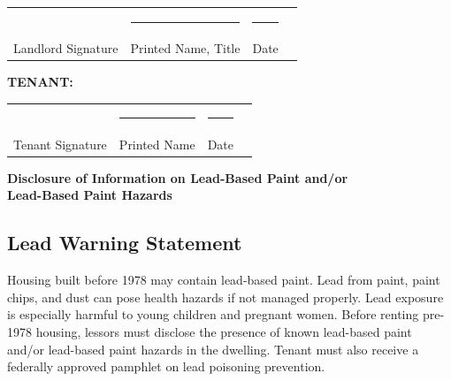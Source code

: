 \documentclass[12pt]{article}
\begin{document}
{\begin{minipage}{\textwidth}
\begin{tabular}{p{} p{} p{}}
                                 & %
    \rule{0.32\textwidth}{0.4pt} & \rule{0.42\textwidth}{0.4pt}                                   & \rule{0.15\textwidth}{0.4pt} \\
    Landlord Signature           & Printed Name, Title                                            & Date \\
\end{tabular}

\vspace{2em}

\textbf{TENANT:}

\vspace{3.5em}

\begin{tabular}{p{} p{} p{}}
                                 & %
    \rule{0.32\textwidth}{0.4pt} & \rule{0.42\textwidth}{0.4pt} & \rule{0.15\textwidth}{0.4pt} \\
    Tenant Signature             & Printed Name                 & Date \\
\end{tabular}
\end{minipage}

\newpage

\begin{center}
    {\large\bfseries Disclosure of Information on Lead-Based Paint and/or\\
    Lead-Based Paint Hazards}
\end{center}

\vspace{1em}

\subsection*{Lead Warning Statement}

Housing built before 1978 may contain lead-based paint. Lead from paint, paint chips, and dust
can pose health hazards if not managed properly. Lead exposure is especially harmful to young
children and pregnant women. Before renting pre-1978 housing, lessors must disclose the
presence of known lead-based paint and/or lead-based paint hazards in the dwelling. Tenant
must also receive a federally approved pamphlet on lead poisoning prevention.

}
\end{document}
